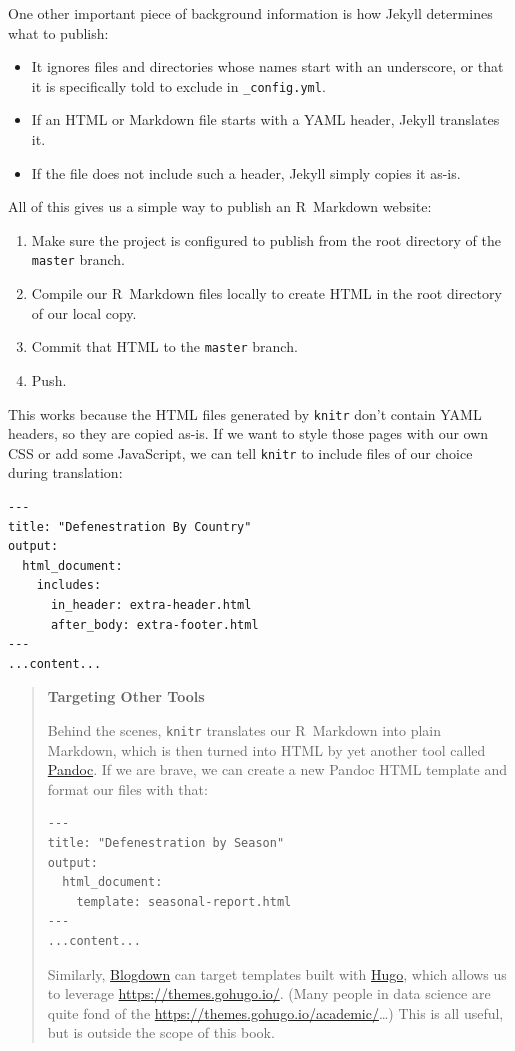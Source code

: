 \noindent
One other important piece of background information is how Jekyll determines what to publish:

\begin{itemize}
\item
  It ignores files and directories whose names start with an underscore,
  or that it is specifically told to exclude in \texttt{\_config.yml}.
\item
  If an HTML or Markdown file starts with a YAML header,
  Jekyll translates it.
\item
  If the file does not include such a header,
  Jekyll simply copies it as-is.
\end{itemize}

All of this gives us a simple way to publish an R~Markdown website:

\begin{enumerate}
\item
  Make sure the project is configured to publish from the root directory of the \texttt{master} branch.
\item
  Compile our R~Markdown files locally to create HTML in the root directory of our local copy.
\item
  Commit that HTML to the \texttt{master} branch.
\item
  Push.
\end{enumerate}

\noindent
This works because the HTML files generated by \texttt{knitr} don't contain YAML headers,
so they are copied as-is.
If we want to style those pages with our own CSS or add some JavaScript,
we can tell \texttt{knitr} to include files of our choice during translation:

\begin{lstlisting}
---
title: "Defenestration By Country"
output:
  html_document:
    includes:
      in_header: extra-header.html
      after_body: extra-footer.html
---
...content...
\end{lstlisting}

\begin{quote}
\textbf{Targeting Other Tools}

Behind the scenes,
\texttt{knitr} translates our R~Markdown into plain Markdown,
which is then turned into HTML by yet another tool called \href{https://pandoc.org/}{Pandoc}.
If we are brave,
we can create a new Pandoc HTML template and format our files with that:

\begin{lstlisting}
---
title: "Defenestration by Season"
output:
  html_document:
    template: seasonal-report.html
---
...content...
\end{lstlisting}

\noindent
Similarly,
\href{https://bookdown.org/yihui/blogdown/}{Blogdown} can target templates built with \href{https://gohugo.io/}{Hugo},
which allows us to leverage \href{hundreds of different themes}{https://themes.gohugo.io/}.
(Many people in data science are quite fond of the \href{Academic theme}{https://themes.gohugo.io/academic/}{\ldots})
This is all useful,
but is outside the scope of this book.
\end{quote}

